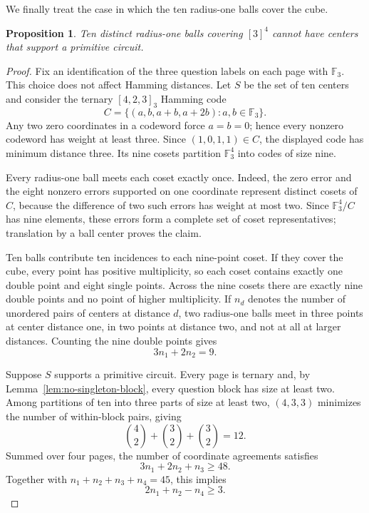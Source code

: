 \documentclass[11pt]{article}
\newtheorem{proposition}[theorem]{Proposition}
\theoremstyle{definition}
\theoremstyle{remark}
\newcommand{\F}{\mathbb{F}}
\numberwithin{equation}{section}
\begin{document}
We finally treat the case in which the ten radius-one balls cover the cube.

\begin{proposition}\label{prop:ten-cover}
Ten distinct radius-one balls covering \([3]^4\) cannot have centers that
support a primitive circuit.
\end{proposition}

\begin{proof}
Fix an identification of the three question labels on each page with
\(\F_3\).  This choice does not affect Hamming distances.  Let \(S\) be the
set of ten centers and consider the ternary \([4,2,3]_3\)
Hamming code
\[
  C=\{(a,b,a+b,a+2b):a,b\in\F_3\}.
\]
Any two zero coordinates in a codeword force \(a=b=0\); hence every nonzero
codeword has weight at least three.  Since \((1,0,1,1)\in C\), the displayed
code has minimum distance three.  Its nine cosets partition \(\F_3^4\) into
codes of size nine.

Every radius-one ball meets each coset exactly once.  Indeed, the zero error
and the eight nonzero errors supported on one coordinate represent distinct
cosets of \(C\), because the difference of two such errors has weight at most
two.  Since \(\F_3^4/C\) has nine elements, these errors form a complete set
of coset representatives; translation by a ball center proves the claim.

Ten balls contribute ten incidences to each nine-point coset.  If they cover
the cube, every point has positive multiplicity, so each coset contains
exactly one double point and eight single points.  Across the nine cosets
there are exactly nine double points and no point of higher multiplicity.  If
\(n_d\) denotes the number of unordered pairs of centers at distance \(d\),
two radius-one balls meet in three points at center distance one, in two
points at distance two, and not at all at larger distances.  Counting the
nine double points gives
\begin{equation}\label{eq:intersection-app}
  3n_1+2n_2=9.
\end{equation}

Suppose \(S\) supports a primitive circuit.  Every page is ternary and,
by Lemma~\ref{lem:no-singleton-block}, every question block has size at least
two.  Among partitions of ten into three parts of size at least two,
\((4,3,3)\) minimizes the number of within-block pairs, giving
\[
  \binom42+\binom32+\binom32=12.
\]
Summed over four pages, the number of coordinate agreements satisfies
\[
  3n_1+2n_2+n_3
  \geq48.
\]
Together with \(n_1+n_2+n_3+n_4=45\), this implies
\[
  2n_1+n_2-n_4
  \geq3.
\]


\end{proof}
\end{document}
